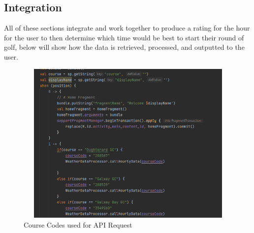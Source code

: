 \subsection{Integration}
All of these sections integrate and work together to produce a rating for the hour for the user to then determine which time would be best to start their round of golf, below will show how the data is retrieved, processed, and outputted to the user.
\begin{figure}[H]
    \centering
    \includegraphics[width=12cm,height = 8cm]{img/CourseCodes.PNG}
    \caption{Course Codes used for API Request}
    \label{fig:altas config}
\end{figure}

